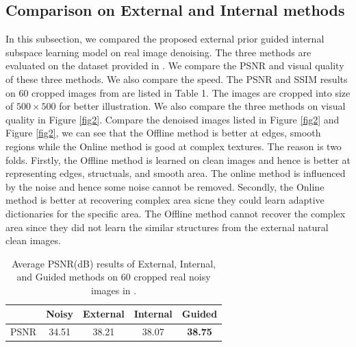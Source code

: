 \documentclass[10pt,twocolumn,letterpaper]{article}
\begin{document}
\subsection{Comparison on External and Internal methods}
In this subsection, we compared the proposed external prior guided internal subspace learning model on real image denoising. The three methods are evaluated on the dataset provided in \cite{crosschannel2016}. We compare the PSNR and visual quality of these three methods. We also compare the speed. The PSNR and SSIM results on 60 cropped images from \cite{crosschannel2016} are listed in Table 1. The images are cropped into size of $500\times 500$ for better illustration. We also compare the three methods on visual quality in Figure \ref{fig2}. Compare the denoised images listed in Figure \ref{fig2} and Figure \ref{fig2}, we can see that the Offline method is better at edges, smooth regions while the Online method is good at complex textures. The reason is two folds. Firstly, the Offline method is learned on clean images and hence is better at representing edges, structuals, and smooth area. The online method is influenced by the noise and hence some noise cannot be removed. Secondly, the Online method is better at recovering complex area sicne they could learn adaptive dictionaries for the specific area. The Offline method cannot recover the complex area since they did not learn the similar structures from the external natural clean images.

\begin{table}\label{tab1}
\caption{Average PSNR(dB) results of External, Internal, and Guided methods on 60 cropped real noisy images in \cite{crosschannel2016}.}
\label{tab1}
\begin{center}
\renewcommand\arraystretch{1}
\begin{tabular}{|c||c|c|c|c|}
\hline
 & \textbf{Noisy} &\textbf{External} &\textbf{Internal} &\textbf{Guided}  
\\
\hline
PSNR & 34.51 & 38.21 & 38.07 & \textbf{38.75} 
\\
\hline
\end{tabular}
\end{center}
\end{table}
\end{document}
